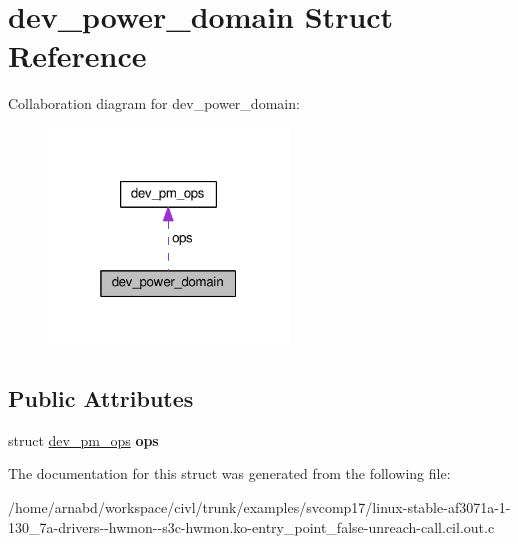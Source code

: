 \hypertarget{structdev__power__domain}{}\section{dev\+\_\+power\+\_\+domain Struct Reference}
\label{structdev__power__domain}


Collaboration diagram for dev\+\_\+power\+\_\+domain\+:
\nopagebreak
\begin{figure}[H]
\begin{center}
\leavevmode
\includegraphics[width=181pt]{structdev__power__domain__coll__graph}
\end{center}
\end{figure}
\subsection*{Public Attributes}
\begin{DoxyCompactItemize}
\item 
\hypertarget{structdev__power__domain_ae0834f36bb033a461e6d0aae83486e36}{}struct \hyperlink{structdev__pm__ops}{dev\+\_\+pm\+\_\+ops} {\bfseries ops}\label{structdev__power__domain_ae0834f36bb033a461e6d0aae83486e36}

\end{DoxyCompactItemize}


The documentation for this struct was generated from the following file\+:\begin{DoxyCompactItemize}
\item 
/home/arnabd/workspace/civl/trunk/examples/svcomp17/linux-\/stable-\/af3071a-\/1-\/130\+\_\+7a-\/drivers-\/-\/hwmon-\/-\/s3c-\/hwmon.\+ko-\/entry\+\_\+point\+\_\+false-\/unreach-\/call.\+cil.\+out.\+c\end{DoxyCompactItemize}
